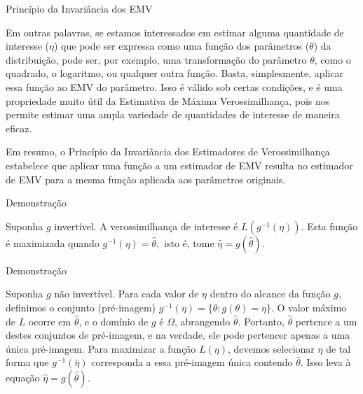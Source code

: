 \documentclass[12pt]{beamer}
\begin{document}
\begin{frame}{Princípio da Invariância dos EMV}
\begin{block}{}
\justifying
Em outras palavras, se estamos interessados em estimar alguma quantidade de interesse (\(\eta\)) que pode ser expressa como uma função dos parâmetros (\(\theta\)) da distribuição, pode ser, por exemplo, uma transformação do parâmetro $\theta$, como o quadrado, o logaritmo, ou qualquer outra função. Basta, simplesmente, aplicar essa função ao EMV do parâmetro. Isso é válido sob certas condições, e é uma propriedade muito útil da Estimativa de Máxima Verossimilhança, pois nos permite estimar uma ampla variedade de quantidades de interesse de maneira eficaz.
\end{block}
\pause
\begin{block}{}
\justifying
Em resumo, o Princípio da Invariância dos Estimadores de Verossimilhança estabelece que aplicar uma função a um estimador de EMV resulta no estimador de EMV para a mesma função aplicada aos parâmetros originais.
\end{block}
\end{frame}

\begin{frame}{Demonstração}
\begin{block}{}
\justifying
Suponha $g$ invertível. A verossimilhança de interesse é $L(g^{-1}(\eta)).$ Esta função é maximizada quando $g^{-1}(\eta)=\hat{\theta},$ isto é, tome $\hat{\eta}=g(\hat{\theta}).$
\end{block}
\end{frame}

\begin{frame}{Demonstração}
\begin{block}{}
\justifying
Suponha $g$ não invertível. Para cada valor de \(\eta\) dentro do alcance da função \(g\), definimos o conjunto (pré-imagem) \(g^{-1}(\eta) = \{\theta : g(\theta) = \eta\}\). O valor máximo de \(L\) ocorre em \(\hat{\theta}\), e o domínio de \(g\) é \(\Omega\), abrangendo \(\hat{\theta}\). Portanto, \(\hat{\theta}\) pertence a um destes conjuntos de pré-imagem, e na verdade, ele pode pertencer apenas a uma única pré-imagem. Para maximizar a função \(L(\eta)\), devemos selecionar \(\hat{\eta}\) de tal forma que \(g^{-1}(\hat{\eta})\) corresponda a essa pré-imagem única contendo \(\hat{\theta}\). Isso leva à equação \(\hat{\eta} = g(\hat{\theta})\).
\end{block}
\end{frame}
\end{document}
